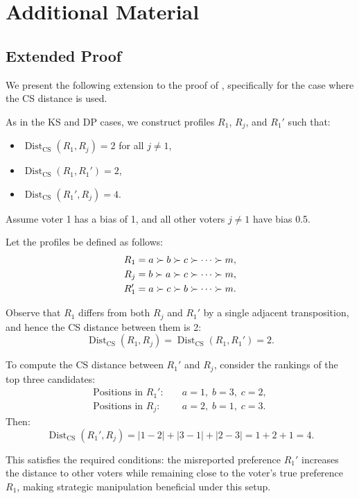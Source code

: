 

\chapter{Additional Material}
\label{AppendixA} %


\section{Extended Proof}
\label{AppendixA:proof} %

We present the following extension to the proof of ,
specifically for the case where the CS distance is used.

\begin{proofc}
	As in the KS and DP cases, we construct profiles \( R_1 \), \( R_j \), and \( R_1' \) such that:
	\begin{itemize}
		\item \( \operatorname{Dist}_{\text{CS}}(R_1, R_j) = 2 \) for all \( j \neq 1 \),
		\item \( \operatorname{Dist}_{\text{CS}}(R_1, R_1') = 2 \),
		\item \( \operatorname{Dist}_{\text{CS}}(R_1', R_j) = 4 \).
	\end{itemize}

	Assume voter 1 has a bias of 1, and all other voters \( j \neq 1 \) have bias 0.5.

	Let the profiles be defined as follows:
	\[
		\begin{aligned}
			R_1  & = a \succ b \succ c \succ \cdots \succ m, \\
			R_j  & = b \succ a \succ c \succ \cdots \succ m, \\
			R_1' & = a \succ c \succ b \succ \cdots \succ m.
		\end{aligned}
	\]

	Observe that \( R_1 \) differs from both \( R_j \) and \( R_1' \) by a single adjacent transposition, and hence the CS distance between them is 2:
	\[
		\operatorname{Dist}_{\text{CS}}(R_1, R_j) = \operatorname{Dist}_{\text{CS}}(R_1, R_1') = 2.
	\]

	To compute the CS distance between \( R_1' \) and \( R_j \), consider the rankings of the top three candidates:
	\[
		\begin{aligned}
			\text{Positions in } R_1': & \quad a = 1,\; b = 3,\; c = 2, \\
			\text{Positions in } R_j:  & \quad a = 2,\; b = 1,\; c = 3.
		\end{aligned}
	\]
	Then:
	\[
		\operatorname{Dist}_{\text{CS}}(R_1', R_j)
		= |1 - 2| + |3 - 1| + |2 - 3| = 1 + 2 + 1 = 4.
	\]

	This satisfies the required conditions: the misreported preference \( R_1' \) increases the distance to other voters while remaining close to the voter’s true preference \( R_1 \), making strategic manipulation beneficial under this setup.
\end{proofc}




